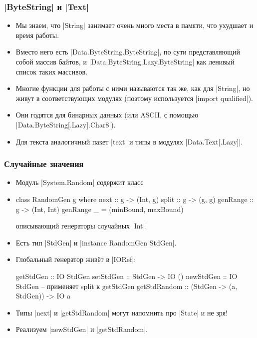 \documentclass[11pt]{beamer}
\begin{document}
\begin{frame}[fragile]
  \frametitle{\haskinline|ByteString| и \haskinline|Text|}
  \begin{itemize}
    \item Мы знаем, что \haskinline|String| занимает очень много места в памяти, что ухудшает и время работы.
    \item Вместо него есть \haskinline|Data.ByteString.ByteString|, по сути представляющий собой массив байтов, и \haskinline|Data.ByteString.Lazy.ByteString| как ленивый список таких массивов.
    \item Многие функции для работы с ними называются так же, как для \haskinline|String|, но живут в соответствующих модулях (поэтому используется \haskinline|import qualified|).
    \item Они годятся для бинарных данных (или ASCII, с помощью \haskinline|Data.ByteString[.Lazy].Char8|).
    \item Для текста аналогичный пакет \haskinline|text| и типы в модулях \haskinline|Data.Text[.Lazy]|.
  \end{itemize}
\end{frame}

\begin{frame}[fragile]
  \frametitle{Случайные значения}
  \begin{itemize}
    \item Модуль \haskinline|System.Random| содержит класс
    \item
          \begin{haskellsmall}
            class RandomGen g where
              next :: g -> (Int, g)
              split :: g -> (g, g)
              genRange :: g -> (Int, Int)
              genRange _ = (minBound, maxBound)
          \end{haskellsmall}
          описывающий генераторы случайных \haskinline|Int|.
    \item Есть тип \haskinline|StdGen| и \haskinline|instance RandomGen StdGen|.
    \item Глобальный генератор живёт в \haskinline|IORef|:
          \begin{haskellsmall}
            getStdGen :: IO StdGen
            setStdGen :: StdGen -> IO ()
            newStdGen :: IO StdGen  -- применяет split к getStdGen
            getStdRandom :: (StdGen -> (a, StdGen)) -> IO a
          \end{haskellsmall}
    \item Типы \haskinline|next| и \haskinline|getStdRandom| могут напомнить про \haskinline|State| и не зря!
    \item Реализуем \haskinline|newStdGen| и \haskinline|getStdRandom|.
  \end{itemize}
\end{frame}
\end{document}

